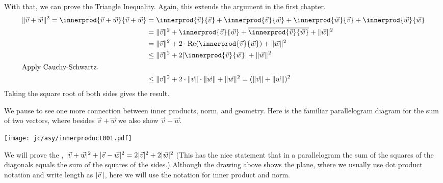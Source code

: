 With that, we can prove the Triangle Inequality.
Again, this extends the argument in the first chapter.
\begin{align*}
  \norm{\vec{v}+\vec{w}}^2
  =\innerprod{\vec{v}+\vec{w}}{\vec{v}+\vec{w}}  
  &=\innerprod{\vec{v}}{\vec{v}}
    +\innerprod{\vec{v}}{\vec{w}}  
    +\innerprod{\vec{w}}{\vec{v}}  
    +\innerprod{\vec{w}}{\vec{w}}   \\ 
  &=\norm{\vec{v}}^2
    +\innerprod{\vec{v}}{\vec{w}}  
    +\compconj{\innerprod{\vec{v}}{\vec{w}}}  
    +\norm{\vec{w}}^2              \\   
  &=\norm{\vec{v}}^2
    +2\cdot\RE{\innerprod{\vec{v}}{\vec{w}}}  
    +\norm{\vec{w}}^2      \\
  &\leq\norm{\vec{v}}^2
    +2\absval{\innerprod{\vec{v}}{\vec{w}}}  
    +\norm{\vec{w}}^2     \\
\intertext{Apply Cauchy-Schwartz.}
  &\leq\norm{\vec{v}}^2
    +2\cdot\norm{\vec{v}}\cdot\norm{\vec{w}}
    +\norm{\vec{w}}^2      
  =(\norm{\vec{v}}+\norm{\vec{w}})^2         
\end{align*}
Taking the square root of both sides gives the result.

We pause to see one more connection between inner products, norm, and geometry.
Here is the familiar parallelogram diagram for the sum of two vectors,
where besides $\vec{v}+\vec{w}$ we also show $\vec{v}-\vec{w}$. 
\begin{center}
  \texttt{[image: jc/asy/innerproduct001.pdf]}
\end{center}
We will prove the 
,
$\lvert\vec{v}+\vec{w}\rvert^2+\lvert\vec{v}-\vec{w}\rvert^2=2\lvert\vec{v}\rvert^2+2\lvert\vec{w}\rvert^2$
(This has the nice statement that in a parallelogram the sum of the squares 
of the diagonals equals the sum of the squares of the sides.)
Although the drawing above shows the plane, where we usually use dot product 
notation and write length as $\lvert\vec{v}\,\rvert$, 
here we will use the notation for inner product and norm.

